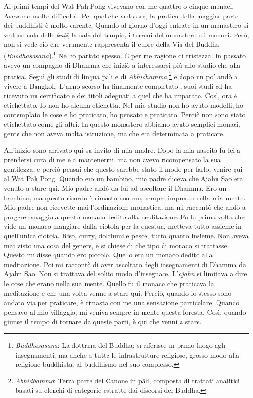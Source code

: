 Ai primi tempi del Wat Pah Pong vivevano con me quattro o cinque monaci.
Avevamo molte difficoltà. Per quel che vedo ora, la pratica della
maggior parte dei buddhisti è molto carente. Quando al giorno d'oggi
entrate in un monastero si vedono solo delle \emph{kuṭī}, la sala del
tempio, i terreni del monastero e i monaci. Però, non si vede ciò che
veramente rappresenta il cuore della Via del Buddha
(\emph{Buddhasāsana}).\footnote{\emph{Buddhasāsana}: La dottrina del
  Buddha; si riferisce in primo luogo agli insegnamenti, ma anche a
  tutte le infrastrutture religiose, grosso modo alla religione
  buddhista, al buddhismo nel suo complesso.} Ne ho parlato spesso. È
per me ragione di tristezza. In passato avevo un compagno di Dhamma che
iniziò a interessarsi più allo studio che alla pratica. Seguì gli studi
di lingua pāli e di \emph{Abhidhamma},\footnote{\emph{Abhidhamma}: Terza
  parte del Canone in pāli, composta di trattati analitici basati su
  elenchi di categorie estratte dai discorsi del Buddha.} e dopo un po'
andò a vivere a Bangkok. L'anno scorso ha finalmente completato i suoi
studi ed ha ricevuto un certificato e dei titoli adeguati a quel che ha
imparato. Così, ora è etichettato. Io non ho alcuna etichetta. Nel mio
studio non ho avuto modelli, ho contemplato le cose e ho praticato, ho
pensato e praticato. Perciò non sono stato etichettato come gli altri.
In questo monastero abbiamo avuto semplici monaci, gente che non aveva
molta istruzione, ma che era determinata a praticare.

All'inizio sono arrivato qui su invito di mia madre. Dopo la mia nascita
fu lei a prendersi cura di me e a mantenermi, ma non avevo ricompensato
la sua gentilezza, e perciò pensai che questo sarebbe stato il modo per
farlo, venire qui al Wat Pah Pong. Quando ero un bambino, mio padre
diceva che Ajahn Sao era venuto a stare qui. Mio padre andò da lui ad
ascoltare il Dhamma. Ero un bambino, ma questo ricordo è rimasto con me,
sempre impresso nella mia mente. Mio padre non ricevette mai
l'ordinazione monastica, ma mi raccontò che andò a porgere omaggio a
questo monaco dedito alla meditazione. Fu la prima volta che vide un
monaco mangiare dalla ciotola per la questua, metteva tutto assieme in
quell'unica ciotola. Riso, curry, dolciumi e pesce, tutto quanto
insieme. Non aveva mai visto una cosa del genere, e si chiese di che
tipo di monaco si trattasse. Questo mi disse quando ero piccolo. Quello
era un monaco dedito alla meditazione. Poi mi raccontò di aver ascoltato
degli insegnamenti di Dhamma da Ajahn Sao. Non si trattava del solito
modo d'insegnare. L'\emph{ajahn} si limitava a dire le cose che erano
nella sua mente. Quello fu il monaco che praticava la meditazione e che
una volta venne a stare qui. Perciò, quando io stesso sono andato via
per praticare, è rimasta con me una sensazione particolare. Quando
pensavo al mio villaggio, mi veniva sempre in mente questa foresta.
Così, quando giunse il tempo di tornare da queste parti, è qui che venni
a stare.

